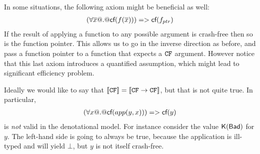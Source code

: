 In some situations, the following axiom might be beneficial as well:
\[\begin{array}{l}
    (\forall \overline{x} @.@ \textsf{cf}(f(\overline{x}))) => \textsf{cf}(f_{ptr})
\end{array}\]
If the result of applying a function to any possible argument is crash-free then 
so is the function pointer. This allows us to go in the inverse direction as before, 
and pass a function pointer to a function that expects a ${\tt CF}$ argument. However notice
that this last axiom introduces a quantified assumption, which might lead to significant
efficiency problem.

Ideally we would like to say that $[\![{\tt CF}]\!] = [\![{\tt CF} \rightarrow {\tt CF}]\!]$,
but that is not quite true.  In particular, 
\[\begin{array}{l}
   (\forall x @.@ \textsf{cf}(app(y,x))) => \textsf{cf}(y)
\end{array}\]
is {\em not} valid in the denotational model. For instance consider the
value $\mathsf{K}(\mathsf{Bad})$ for $y$. The left-hand side is going to always 
be true, because the application is ill-typed and will yield $\bot$, but $y$ 
is not itself crash-free.


